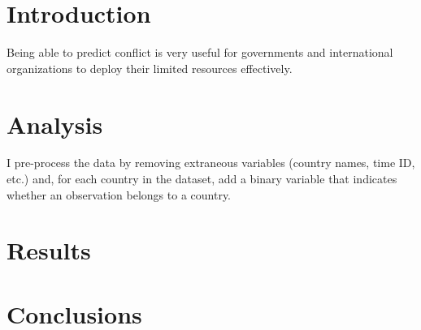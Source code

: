 \documentclass[a0,portrait]{a0poster}
\begin{document}
\begin{multicols}{2} %


\color{Navy} %


\color{SaddleBrown} %

\section*{Introduction}

Being able to predict conflict is very useful for governments and international organizations to deploy their limited resources effectively.

\color{DarkSlateGray} %


\section*{Analysis}

I pre-process the data by removing extraneous variables (country names, time ID, etc.) and, for each country in the dataset, add a binary variable that indicates whether an observation belongs to a country.

\section*{Results}


\color{SaddleBrown} %

\section*{Conclusions}


\end{multicols}
\end{document}
